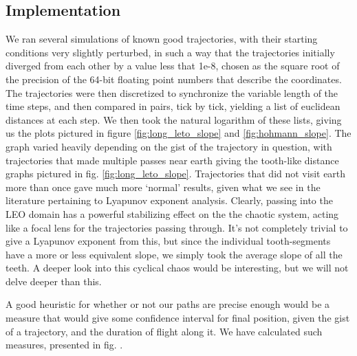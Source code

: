\subsection{Implementation}

We ran several simulations of known good trajectories, with their starting conditions very slightly perturbed, in such a way that the trajectories initially diverged from each other by a value less that 1e-8, chosen as the square root of the precision of the 64-bit floating point numbers that describe the coordinates. The trajectories were then discretized to synchronize the variable length of the time steps, and then compared in pairs, tick by tick, yielding a list of euclidean distances at each step. We then took the natural logarithm of these lists, giving us the plots pictured in figure \ref{fig:long_leto_slope} and \ref{fig:hohmann_slope}. The graph varied heavily depending on the gist of the trajectory in question, with trajectories that made multiple passes near earth giving the tooth-like distance graphs pictured in fig. \ref{fig:long_leto_slope}. Trajectories that did not visit earth more than once gave much more `normal' results, given what we see in the literature pertaining to Lyapunov exponent analysis. Clearly, passing into the LEO domain has a powerful stabilizing effect on the the chaotic system, acting like a focal lens for the trajectories passing through. It's not completely trivial to give a Lyapunov exponent from this, but since the individual tooth-segments have a more or less equivalent slope, we simply took the average slope of all the teeth. A deeper look into this cyclical chaos would be interesting, but we will not delve deeper than this.

A good heuristic for whether or not our paths are precise enough would be a measure that would give some confidence interval for final position, given the gist of a trajectory, and the duration of flight along it. We have calculated such measures, presented in fig. .

